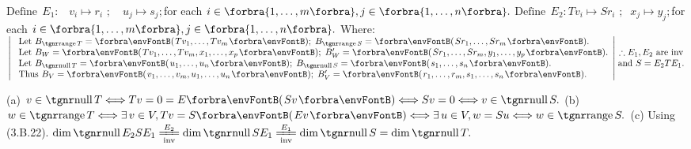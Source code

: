 
$\text{Define}\;\,E_1:\,\,\,\,\, v_i\mapsto r_i\,\,;\quad u_j\mapsto s_j;$\quad for each $i\in\Bra{1,\dots,m},j\in\Bra{1,\dots,n}.$\parSol{}
$\text{Define}\;\,E_2:Tv_i\mapsto Sr_i\,\,;\;\;x_j\mapsto y_j;$\quad for each $i\in\Bra{1,\dots,m},j\in\Bra{1,\dots,n}.$
Where:\parSol{\vspace{6pt}}
$\MathLeftrightMid{l}{$
	Let $B_{\range T}=\Par{Tv_1,\dots,Tv_m};\;B_{\range S}=\Par{Sr_1,\dots,Sr_m}.\\ $
	Let $B_W=\Par{Tv_1,\dots,Tv_m,x_1,\dots,x_p};\;B_W'=\Par{Sr_1,\dots,Sr_m,y_1,\dots,y_p}.\\ $
	Let $B_{\null T}=\Par{u_1,\dots,u_n};\;B_{\null S}=\Par{s_1,\dots,s_n}.\\ $
	Thus $B_V=\Par{v_1,\dots,v_m,u_1,\dots,u_n};\;B_V'=\Par{r_1,\dots,r_m,s_1,\dots,s_n}.}\hMath{c}{}{}{\therefore E_1,E_2$ are inv$ \\ $and $S=E_2 TE_1.}$\PfEnd
\SepLine[0pt][\Blind{\BulletPointX} ]

(a) $v\in\null T\Longleftrightarrow Tv=0=E\Par{Sv}\Longleftrightarrow Sv=0\Longleftrightarrow v\in\null S.$\parSol{}
(b) $w\in\range T\Longleftrightarrow\exists\,v\in V,Tv=S\Par{Ev}\Longleftrightarrow\exists\,u\in V,w=Su\Longleftrightarrow w\in\range S.$\parSol{}
(c) Using (3.B.22). $\dim\null E_2SE_1\xlongequal[\text{inv}]{E_2}\dim\null SE_1\xlongequal[\text{inv}]{E_1}\dim\null S=\dim\null T.$\PfEnd
\SepLine

